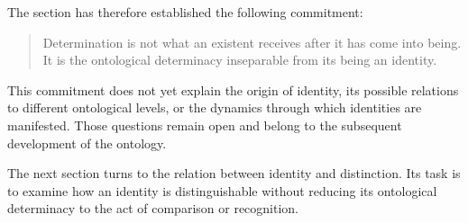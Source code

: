 The section has therefore established the following
commitment:

\begin{quote}
Determination is not what an existent receives after
it has come into being. It is the ontological determinacy
inseparable from its being an identity.
\end{quote}

This commitment does not yet explain the origin of
identity, its possible relations to different ontological
levels, or the dynamics through which identities are
manifested. Those questions remain open and belong
to the subsequent development of the ontology.

The next section turns to the relation between identity
and distinction. Its task is to examine how an identity
is distinguishable without reducing its ontological
determinacy to the act of comparison or recognition.
